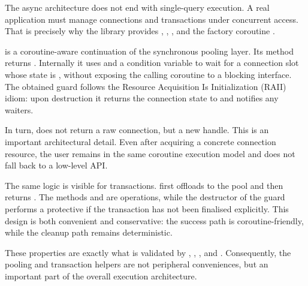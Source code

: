 The async architecture does not end with single-query execution. A real application must manage connections and transactions under concurrent access. That is precisely why the library provides , , , and the factory coroutine .

 is a coroutine-aware continuation of the synchronous pooling layer. Its  method returns . Internally it uses  and a condition variable to wait for a connection slot whose state is , without exposing the calling coroutine to a blocking interface. The obtained guard follows the Resource Acquisition Is Initialization (RAII) idiom: upon destruction it returns the connection state to  and notifies any waiters.

In turn,  does not return a raw connection, but a new  handle. This is an important architectural detail. Even after acquiring a concrete connection resource, the user remains in the same coroutine execution model and does not fall back to a low-level API.

The same logic is visible for transactions.  first offloads  to the pool and then returns . The methods  and  are  operations, while the destructor of the guard performs a protective  if the transaction has not been finalised explicitly. This design is both convenient and conservative: the success path is coroutine-friendly, while the cleanup path remains deterministic.

These properties are exactly what is validated by , , , and . Consequently, the pooling and transaction helpers are not peripheral conveniences, but an important part of the overall execution architecture.

